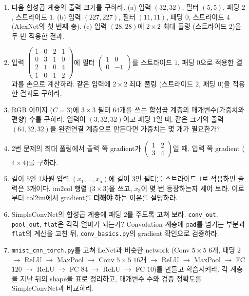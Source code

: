 \documentclass[11pt,a4paper]{article}
\begin{document}
\begin{enumerate}[label=\arabic*.]

\item 다음 합성곱 계층의 출력 크기를 구하라.
(a) 입력 $(32,32)$, 필터 $(5,5)$, 패딩 $2$, 스트라이드 $1$.
(b) 입력 $(227,227)$, 필터 $(11,11)$, 패딩 $0$, 스트라이드 $4$ (AlexNet의 첫 번째 층).
(c) 입력 $(28,28)$에 $2\times2$ 최대 풀링 (스트라이드 $2$)을 두 번 적용한 결과.

\item 입력 $\begin{pmatrix}1&0&2&1\\0&3&1&0\\2&1&0&4\\1&0&1&2\end{pmatrix}$에
필터 $\begin{pmatrix}1&0\\0&-1\end{pmatrix}$를 스트라이드 $1$, 패딩 $0$으로 적용한 결과를 손으로 계산하라.
같은 입력에 $2\times2$ 최대 풀링 (스트라이드 $2$, 패딩 $0$)을 적용한 결과도 구하라.

\item RGB 이미지 ($C=3$)에 $3\times3$ 필터 $64$개를 쓰는 합성곱 계층의 매개변수(가중치와 편향) 수를 구하라.
입력이 $(3,32,32)$이고 패딩 $1$일 때, 같은 크기의 출력 $(64,32,32)$을 완전연결 계층으로 만든다면 가중치는 몇 개가 필요한가?

\item 2번 문제의 최대 풀링에서 출력 쪽 gradient가 $\begin{pmatrix}1&2\\3&4\end{pmatrix}$일 때,
입력 쪽 gradient ($4\times4$)를 구하라.

\item 길이 $5$인 1차원 입력 $(x_1,\ldots,x_5)$에 길이 $3$인 필터를 스트라이드 $1$로 적용하면 출력은 $3$개이다.
im2col 행렬 ($3\times3$)을 쓰고, $x_3$이 몇 번 등장하는지 세어 보라.
이로부터 col2im에서 gradient를 \textbf{더해야} 하는 이유를 설명하라.

\item SimpleConvNet의 합성곱 계층에 패딩 $2$를 주도록 고쳐 보라.
\texttt{conv\_out}, \texttt{pool\_out}, \texttt{flat}은 각각 얼마가 되는가?
Convolution 계층에 \texttt{pad}를 넘기는 부분과 \texttt{flat}의 계산을 고친 뒤,
\texttt{conv\_basics.py}의 gradient 확인으로 검증하라.

\item \texttt{mnist\_cnn\_torch.py}를 고쳐 LeNet과 비슷한 network
(Conv $5\times5$ $6$개, 패딩 $2$ $\to$ ReLU $\to$ MaxPool $\to$ Conv $5\times5$ $16$개 $\to$ ReLU $\to$ MaxPool $\to$ FC $120$ $\to$ ReLU $\to$ FC $84$ $\to$ ReLU $\to$ FC $10$)를 만들고 학습시켜라.
각 계층을 지난 뒤의 shape을 표로 정리하고, 매개변수 수와 검증 정확도를 SimpleConvNet과 비교하라.

\end{enumerate}
\end{document}
